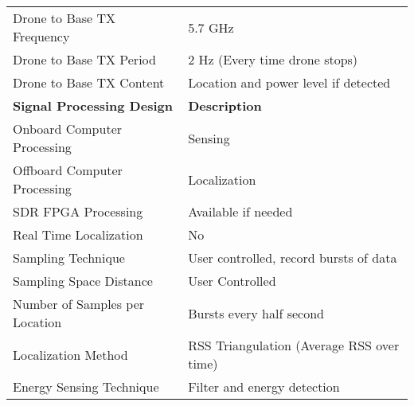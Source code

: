 \begin{table}[ht]
\begin{tabular}{|l|l|}
            Drone to Base TX Frequency            & 5.7 GHz                                   \\
            Drone to Base TX Period               & 2 Hz (Every time drone stops)             \\
            Drone to Base TX Content              & Location and power level if detected      \\
    \hline  \textbf{Signal Processing Design}     & \textbf{Description}                      \\ \hline
            Onboard Computer Processing           & Sensing                                   \\
            Offboard Computer Processing          & Localization                              \\
            SDR FPGA Processing                   & Available if needed                       \\
            Real Time Localization                & No                                        \\
            Sampling Technique                    & User controlled, record bursts of data    \\
            Sampling Space Distance               & User Controlled                           \\
            Number of Samples per Location        & Bursts every half second                  \\
            Localization Method                   & RSS Triangulation (Average RSS over time) \\
            Energy Sensing Technique              & Filter and energy detection               \\ \hline
\end{tabular}
\end{table}\par

